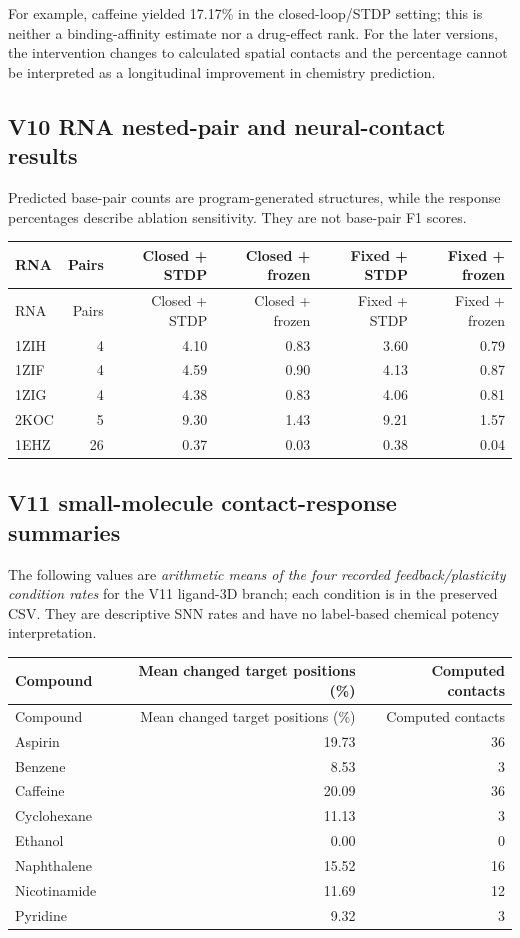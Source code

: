 \documentclass[11pt,a4paper]{article}
\begin{document}
For example, caffeine yielded 17.17\% in the closed-loop/STDP setting; this is neither a binding-affinity estimate nor a drug-effect rank. For the later versions, the intervention changes to calculated spatial contacts and the percentage cannot be interpreted as a longitudinal improvement in chemistry prediction.

\subsection{V10 RNA nested-pair and neural-contact results}
Predicted base-pair counts are program-generated structures, while the response percentages describe ablation sensitivity. They are not base-pair F1 scores.
\begin{center}\footnotesize
\begin{longtable}{lrrrrr}
\toprule
RNA & Pairs & Closed + STDP & Closed + frozen & Fixed + STDP & Fixed + frozen\\
\midrule
\endfirsthead
\toprule
RNA & Pairs & Closed + STDP & Closed + frozen & Fixed + STDP & Fixed + frozen\\
\midrule
\endhead
1ZIH & 4 & 4.10 & 0.83 & 3.60 & 0.79\\
1ZIF & 4 & 4.59 & 0.90 & 4.13 & 0.87\\
1ZIG & 4 & 4.38 & 0.83 & 4.06 & 0.81\\
2KOC & 5 & 9.30 & 1.43 & 9.21 & 1.57\\
1EHZ & 26 & 0.37 & 0.03 & 0.38 & 0.04\\
\bottomrule
\end{longtable}
\end{center}

\subsection{V11 small-molecule contact-response summaries}
The following values are \emph{arithmetic means of the four recorded feedback/plasticity condition rates} for the V11 ligand-3D branch; each condition is in the preserved CSV. They are descriptive SNN rates and have no label-based chemical potency interpretation.
\begin{center}\footnotesize
\begin{longtable}{lrr}
\toprule
Compound & Mean changed target positions (\%) & Computed contacts\\
\midrule
\endfirsthead
\toprule
Compound & Mean changed target positions (\%) & Computed contacts\\
\midrule
\endhead
Aspirin & 19.73 & 36\\
Benzene & 8.53 & 3\\
Caffeine & 20.09 & 36\\
Cyclohexane & 11.13 & 3\\
Ethanol & 0.00 & 0\\
Naphthalene & 15.52 & 16\\
Nicotinamide & 11.69 & 12\\
Pyridine & 9.32 & 3\\
\bottomrule
\end{longtable}
\end{center}
\end{document}
